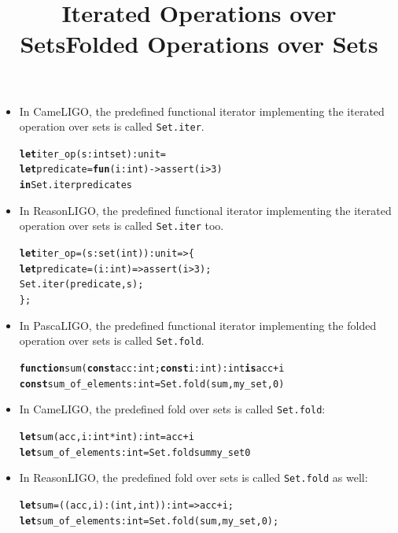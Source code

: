 \documentclass[wide]{slides}
\newcommand{\Kconst}[0]{\textbf{const}\xspace}
\newcommand{\Kfunction}[0]{\textbf{function}\xspace}
\newcommand{\Kin}[0]{\textbf{in}\xspace}
\newcommand{\Kis}[0]{\textbf{is}\xspace}
\newcommand{\Kfun}[0]{\textbf{fun}\xspace}
\newcommand{\Klet}[0]{\textbf{let}\xspace}
\begin{document}
\begin{slide}
  \title{Iterated Operations over Sets}

  \begin{itemize}

    \item In CameLIGO, the predefined functional iterator implementing
      the iterated operation over sets is called \texttt{Set.iter}.
      \begin{alltt}
\Klet iter_op (s : int set) : unit =
  \Klet predicate = \Kfun (i : int) -> assert (i > 3)
  \Kin Set.iter predicate s
      \end{alltt}

    \item In ReasonLIGO, the predefined functional iterator implementing
      the iterated operation over sets is called \texttt{Set.iter}
      too.
      \begin{alltt}
\Klet iter_op = (s : set (int)) : unit => \{
  \Klet predicate = (i : int) => assert (i > 3);
  Set.iter (predicate, s);
\};
      \end{alltt}

  \end{itemize}

\end{slide}

\begin{slide}
  \title{Folded Operations over Sets}

  \begin{itemize}

    \item In PascaLIGO, the predefined functional iterator
      implementing the folded operation over sets is called
      \texttt{Set.fold}.
      \begin{alltt}
\Kfunction sum (\Kconst acc : int; \Kconst i : int): int \Kis acc + i
\Kconst sum_of_elements : int = Set.fold (sum, my_set, 0)
      \end{alltt}

    \item In CameLIGO, the predefined fold over sets is called
      \texttt{Set.fold}:
      \begin{alltt}
\Klet sum (acc, i : int * int) : int = acc + i
\Klet sum_of_elements : int = Set.fold sum my_set 0
      \end{alltt}

    \item In ReasonLIGO, the predefined fold over sets is called
      \texttt{Set.fold} as well:
      \begin{alltt}
\Klet sum = ((acc, i) : (int, int)) : int => acc + i;
\Klet sum_of_elements : int = Set.fold (sum, my_set, 0);
      \end{alltt}

  \end{itemize}

\end{slide}
\end{document}
